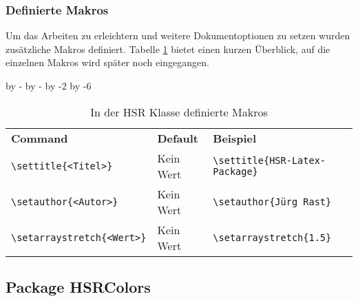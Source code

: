 \subsubsection{Definierte Makros}
Um das Arbeiten zu erleichtern und weitere Dokumentoptionen zu setzen wurden zusätzliche Makros definiert.
Tabelle \ref{tab:DokKlasseHSR:Makros} bietet einen kurzen Überblick, auf die einzelnen Makros wird später
noch eingegangen.

\setlength{\ci}{4.5cm}
\settowidth{\cii}{Kein Wert}
\setlength{\ciii}{\textwidth}
\advance\ciii by -\ci
\advance\ciii by -\cii
\advance\ciii by -2\arrayrulewidth
\advance\ciii by -6\tabcolsep

\begin{table}[!ht]
\centering
{}
\begin{tabular}{p{\ci}|p{\cii}|p{\ciii}}
	\rowcolor{HSRLakeGreen40}
	\textbf{Command} 				& \textbf{Default} & \textbf{Beispiel}
	\\
	\verb+\settitle{<Titel>}+ 		& Kein Wert & \verb+\settitle{HSR-Latex-Package}+
	\\
	\verb+\setauthor{<Autor>}+ 		& Kein Wert & \verb+\setauthor{Jürg Rast}+
	\\
	\verb+\setarraystretch{<Wert>}+ & Kein Wert & \verb+\setarraystretch{1.5}+
\end{tabular}
\caption{In der HSR Klasse definierte Makros}
\label{tab:DokKlasseHSR:Makros}
\end{table}



\subsection{Package HSRColors}
